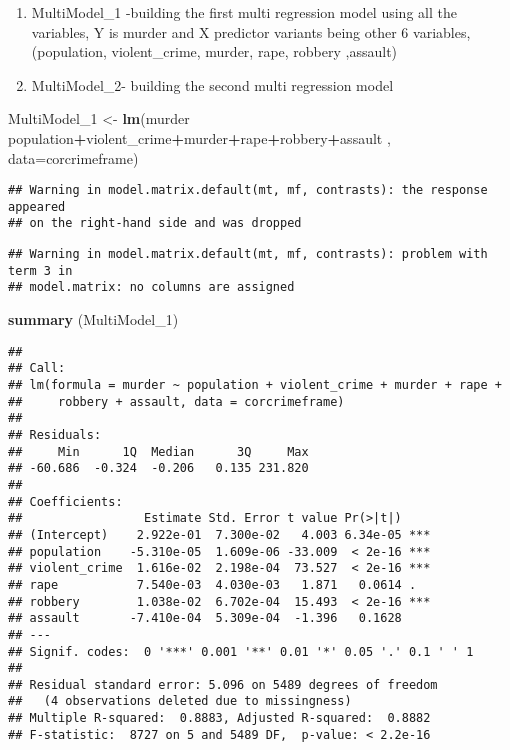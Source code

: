 \documentclass[]{article}
\newenvironment{Shaded}{\begin{snugshade}}{\end{snugshade}}
\newcommand{\KeywordTok}[1]{\textcolor[rgb]{0.13,0.29,0.53}{\textbf{#1}}}
\newcommand{\DataTypeTok}[1]{\textcolor[rgb]{0.13,0.29,0.53}{#1}}
\newcommand{\DecValTok}[1]{\textcolor[rgb]{0.00,0.00,0.81}{#1}}
\newcommand{\StringTok}[1]{\textcolor[rgb]{0.31,0.60,0.02}{#1}}
\newcommand{\OperatorTok}[1]{\textcolor[rgb]{0.81,0.36,0.00}{\textbf{#1}}}
\newcommand{\NormalTok}[1]{#1}
\begin{document}
\begin{enumerate}
\def\labelenumi{\alph{enumi})}
\item
  MultiModel\_1 -building the first multi regression model using all the
  variables, Y is murder and X predictor variants being other 6
  variables, (population, violent\_crime, murder, rape, robbery
  ,assault)
\item
  MultiModel\_2- building the second multi regression model
\end{enumerate}

\begin{Shaded}
\begin{Highlighting}[]
\NormalTok{MultiModel_}\DecValTok{1}\NormalTok{ <-}\StringTok{ }\KeywordTok{lm}\NormalTok{(murder }\OperatorTok{~}\StringTok{ }\NormalTok{population}\OperatorTok{+}\NormalTok{violent_crime}\OperatorTok{+}\NormalTok{murder}\OperatorTok{+}\NormalTok{rape}\OperatorTok{+}\NormalTok{robbery}\OperatorTok{+}\NormalTok{assault , }\DataTypeTok{data=}\NormalTok{corcrimeframe)}
\end{Highlighting}
\end{Shaded}

\begin{verbatim}
## Warning in model.matrix.default(mt, mf, contrasts): the response appeared
## on the right-hand side and was dropped
\end{verbatim}

\begin{verbatim}
## Warning in model.matrix.default(mt, mf, contrasts): problem with term 3 in
## model.matrix: no columns are assigned
\end{verbatim}

\begin{Shaded}
\begin{Highlighting}[]
\KeywordTok{summary}\NormalTok{ (MultiModel_}\DecValTok{1}\NormalTok{)}
\end{Highlighting}
\end{Shaded}

\begin{verbatim}
## 
## Call:
## lm(formula = murder ~ population + violent_crime + murder + rape + 
##     robbery + assault, data = corcrimeframe)
## 
## Residuals:
##     Min      1Q  Median      3Q     Max 
## -60.686  -0.324  -0.206   0.135 231.820 
## 
## Coefficients:
##                 Estimate Std. Error t value Pr(>|t|)    
## (Intercept)    2.922e-01  7.300e-02   4.003 6.34e-05 ***
## population    -5.310e-05  1.609e-06 -33.009  < 2e-16 ***
## violent_crime  1.616e-02  2.198e-04  73.527  < 2e-16 ***
## rape           7.540e-03  4.030e-03   1.871   0.0614 .  
## robbery        1.038e-02  6.702e-04  15.493  < 2e-16 ***
## assault       -7.410e-04  5.309e-04  -1.396   0.1628    
## ---
## Signif. codes:  0 '***' 0.001 '**' 0.01 '*' 0.05 '.' 0.1 ' ' 1
## 
## Residual standard error: 5.096 on 5489 degrees of freedom
##   (4 observations deleted due to missingness)
## Multiple R-squared:  0.8883, Adjusted R-squared:  0.8882 
## F-statistic:  8727 on 5 and 5489 DF,  p-value: < 2.2e-16
\end{verbatim}
\end{document}
